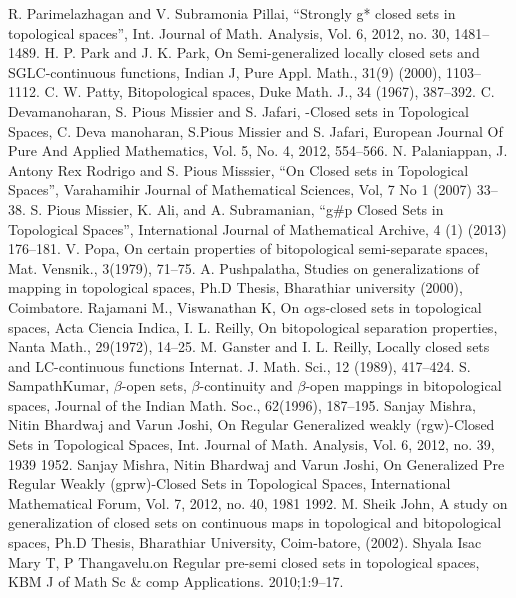 \begin{thebibliography}{99}
 R. Parimelazhagan and V. Subramonia Pillai, ``Strongly g* closed sets in topological spaces'',	Int. Journal of Math. Analysis, Vol. 6, 2012, no. 30, 1481--1489.
H. P. Park and J. K. Park, On Semi-generalized locally closed sets and SGLC-continuous functions, Indian J, Pure Appl. Math., 31(9) (2000), 1103--1112.
 C. W. Patty, Bitopological spaces, Duke Math. J., 34 (1967), 387--392.
 C. Devamanoharan, S. Pious Missier and S. Jafari, -Closed sets in Topological Spaces,
 C. Deva manoharan, S.Pious Missier and S. Jafari, European Journal Of Pure And	Applied Mathematics, Vol. 5, No. 4, 2012, 554--566.
 N. Palaniappan, J. Antony Rex Rodrigo and S. Pious Misssier, ``On Closed sets in Topological Spaces'', Varahamihir Journal of Mathematical Sciences, Vol, 7 No 1 (2007) 33--38.
	S. Pious Missier, K. Ali, and A. Subramanian, ``g\#p  Closed Sets in Topological Spaces'', International Journal of Mathematical Archive, 4 (1) (2013) 176--181.
 V. Popa, On certain properties of bitopological semi-separate spaces, Mat. Vensnik., 3(1979), 71--75.
 A. Pushpalatha, Studies on generalizations of mapping in topological spaces, Ph.D Thesis, Bharathiar university (2000), Coimbatore.
 Rajamani M., Viswanathan K, On $\alpha$gs-closed sets in topological spaces, Acta Ciencia Indica,
 I. L. Reilly, On bitopological separation properties, Nanta Math., 29(1972), 14--25.
 M. Ganster and I. L. Reilly, Locally closed sets and LC-continuous functions Internat. J. Math. Sci., 12 (1989), 417--424.
 S. SampathKumar, $\beta$-open sets, $\beta$-continuity and $\beta$-open mappings in bitopological spaces, Journal of the Indian Math. Soc., 62(1996), 187--195.
 Sanjay Mishra, Nitin Bhardwaj and Varun Joshi, On Regular Generalized weakly (rgw)-Closed Sets in Topological Spaces, Int. Journal of Math. Analysis, Vol. 6, 2012, no. 39, 1939 1952.
 Sanjay Mishra, Nitin Bhardwaj and Varun Joshi, On Generalized Pre Regular Weakly (gprw)-Closed Sets in Topological Spaces, International Mathematical Forum, Vol. 7, 2012, no. 40, 1981 1992.
 M. Sheik John, A study on generalization of closed sets on continuous maps in topological and bitopological spaces, Ph.D Thesis, Bharathiar University, Coim-batore, (2002).
 Shyala Isac Mary T, P Thangavelu.on Regular pre-semi closed sets in topological spaces, KBM J of Math Sc \& comp Applications. 2010;1:9--17.

\end{thebibliography}
